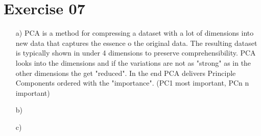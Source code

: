 \documentclass[11pt,a4paper]{scrartcl}
\begin{document}
\section*{Exercise 07}
\begin{itemize}
	\item[a)] PCA is a method for compressing a dataset with a lot of dimensions into new data that captures the essence o the original data. The resulting dataset is typically shown in under 4 dimensions to preserve comprehensibility. PCA looks into the dimensions and if the variations are not as "strong" as in the other dimensions the get "reduced". In the end PCA delivers Principle Components ordered with the "importance". (PC1 most important, PCn n important)
	\item[b)] 
	\item[c)]
\end{itemize}
\end{document}

